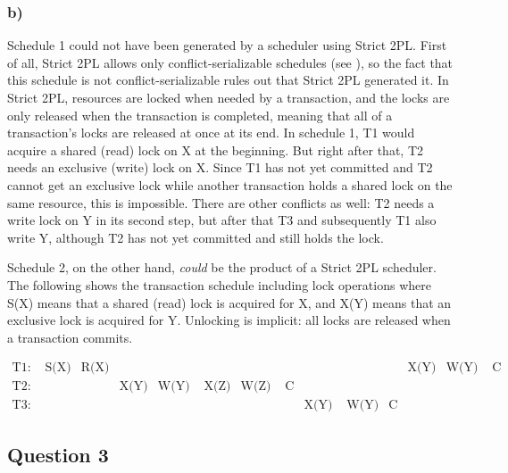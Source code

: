 \documentclass[12pt,a4paper,fleqn]{article}
\begin{document}
\subsubsection*{b)}
Schedule 1 could not have been generated by a scheduler using Strict 2PL. First of all, Strict 2PL allows only conflict-serializable schedules (see \cite{Ramakrishnan2003}), so the fact that this schedule is not conflict-serializable rules out that Strict 2PL generated it. In Strict 2PL, resources are locked when needed by a transaction, and the locks are only released when the transaction is completed, meaning that all of a transaction's locks are released at once at its end. In schedule 1, T1 would acquire a shared (read) lock on X at the beginning. But right after that, T2 needs an exclusive (write) lock on X. Since T1 has not yet committed and T2 cannot get an exclusive lock while another transaction holds a shared lock on the same resource, this is impossible. There are other conflicts as well: T2 needs a write lock on Y in its second step, but after that T3 and subsequently T1 also write Y, although T2 has not yet committed and still holds the lock.

Schedule 2, on the other hand, \emph{could} be the product of a Strict 2PL scheduler. The following shows the transaction schedule including lock operations where S(X) means that a shared (read) lock is acquired for X, and X(Y) means that an exclusive lock is acquired for Y. Unlocking is implicit: all locks are released when a transaction commits.

\begin{align*}
  \text{T1: } & \text{S(X)} & \text{R(X)} & & & & & & & & & \text{X(Y)} & \text{W(Y) } & \text{C} \\
  \text{T2: } & & & \text{X(Y)} & \text{W(Y) } & \text{X(Z)} & \text{W(Z) } & \text{C} & & & & & & \\
  \text{T3: } & & & & & & & & \text{X(Y) } & \text{W(Y)} & \text{C} & & & 
\end{align*} 

\subsection*{Question 3}
\label{sec:qq3}
\end{document}
